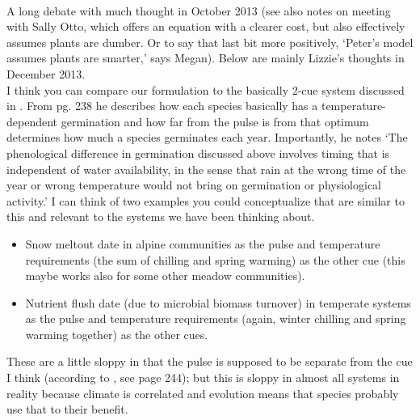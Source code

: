 \documentclass[11pt,a4paper,oneside]{article}
\begin{document}
 \\
\noindent A long debate with much thought in October 2013 (see also notes on meeting with Sally Otto, which offers an equation with a clearer cost, but also effectively assumes plants are dumber. Or to say that last bit more positively, `Peter's model assumes plants are smarter,' says Megan). Below are mainly Lizzie's thoughts in December 2013. \\
I think you can compare our formulation to the basically 2-cue system discussed in \citet{Chesson:2004eo}. From pg. 238 he describes how each species basically has a temperature-dependent germination and how far from the pulse is from that optimum determines how much a species germinates each year. Importantly, he notes `The phenological difference in germination discussed
above involves timing that is independent of water
availability, in the sense that rain at the wrong time of
the year or wrong temperature would not bring on
germination or physiological activity.' I can think of two examples you could conceptualize that are similar to this and relevant to the systems we have been thinking about.
\begin{itemize}
\item Snow meltout date in alpine communities as the pulse and temperature requirements (the sum of chilling and spring warming) as the other cue (this maybe works also for some other meadow communities).
\item Nutrient flush date (due to microbial biomass turnover) in temperate systems as the pulse and temperature requirements (again, winter chilling and spring warming together) as the other cues. 
\end{itemize}
These are a little sloppy in that the pulse is supposed to be separate from the cue I think (according to \citet{Chesson:2004eo}, see page 244); but this is sloppy in almost all systems in reality because climate is correlated and evolution means that species probably use that to their benefit.\\
\end{document}
